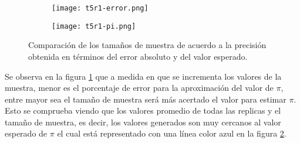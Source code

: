 \documentclass[12pt]{amsart}
\begin{document}
\begin{figure} [h!]
\centering
\begin{subfigure}[b]{0.45\linewidth}
\texttt{[image: t5r1-error.png]}
\caption{}
\label{a}
\end{subfigure}
\begin{subfigure}[b]{0.45\linewidth}
\texttt{[image: t5r1-pi.png]}
\caption{}
\label{b}
\end{subfigure}
\caption{Comparación de los tamaños de muestra de acuerdo a la precisión obtenida en términos del error absoluto y del valor esperado.}
\label{fig4}
\end{figure}
Se observa en la figura \ref{a} que a medida en que se incrementa los valores de la muestra, menor es el porcentaje de error para la aproximación del valor de $\pi$, entre mayor sea el tamaño de muestra será más acertado el valor para estimar $\pi$. Esto se comprueba
viendo que los valores promedio de todas las replicas y el tamaño de muestra, es decir, los valores generados son muy cercanos al valor esperado de $\pi$ el cual está representado con una línea color azul en la figura \ref{b}. 
\end{document}
